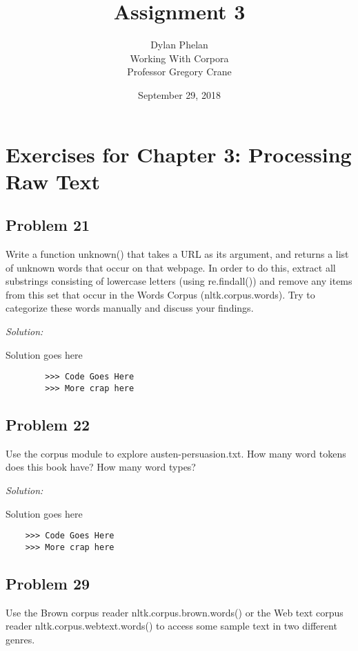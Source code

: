 \documentclass[11pt]{article}
\author{ 
	Dylan Phelan \\ 
	Working With Corpora \\ 
	Professor Gregory Crane 
}
\title{Assignment 3}
\date{September 29, 2018}
\newenvironment{solution}{
	\vspace{10px}\noindent\emph{Solution:}
}{
	\vspace{10px}
}
\begin{document}
\maketitle

\section*{Exercises for Chapter 3: Processing Raw Text}
\subsection*{Problem 21}

 Write a function unknown() that takes a URL as its argument, and returns a list of unknown words that occur on that webpage. In order to do this, extract all substrings consisting of lowercase letters (using re.findall()) and remove any items from this set that occur in the Words Corpus (nltk.corpus.words). Try to categorize these words manually and discuss your findings.

\begin{solution}
	
	Solution goes here
	
	\begin{lstlisting}
		>>> Code Goes Here
		>>> More crap here
	\end{lstlisting}

\end{solution} 


\subsection*{Problem 22}

Use the corpus module to explore austen-persuasion.txt. How many word tokens does this book have? How many word types?

\begin{solution}
	
	Solution goes here
	
	\begin{lstlisting}
	>>> Code Goes Here
	>>> More crap here
	\end{lstlisting}
	
\end{solution} 


\subsection*{Problem 29}
Use the Brown corpus reader nltk.corpus.brown.words() or the Web text corpus reader nltk.corpus.webtext.words() to access some sample text in two different genres.
\end{document}

